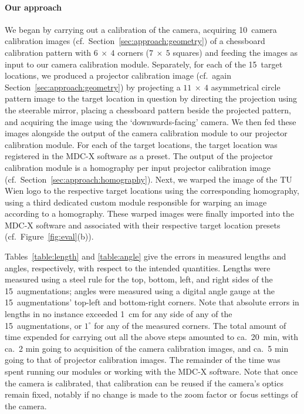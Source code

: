 \documentclass[review]{elsarticle}
\begin{document}
\paragraph{Our approach} We began by carrying out a calibration of the camera, acquiring 10~camera calibration images (cf.\ Section~\ref{sec:approach:geometry}) of a chessboard calibration pattern with $6~\times~4$ corners ($7~\times~5$ squares) and feeding the images as input to our camera calibration module. Separately, for each of the 15~target locations, we produced a projector calibration image (cf.\ again Section~\ref{sec:approach:geometry}) by projecting a $11~\times~4$ asymmetrical circle pattern image to the target location in question by directing the projection using the steerable mirror, placing a chessboard pattern beside the projected pattern, and acquiring the image using the `downwards-facing' camera. We then fed these images alongside the output of the camera calibration module to our projector calibration module. For each of the target locations, the target location was registered in the MDC-X software as a preset. The output of the projector calibration module is a homography per input projector calibration image (cf.\ Section~\ref{sec:approach:homography}). Next, we warped the image of the TU Wien logo to the respective target locations using the corresponding homography, using a third dedicated custom module responsible for warping an image according to a homography. These warped images were finally imported into the MDC-X software and associated with their respective target location presets (cf.\ Figure~\ref{fig:eval}(b)).

Tables~\ref{table:length} and \ref{table:angle} give the errors in measured lengths and angles, respectively, with respect to the intended quantities. Lengths were measured using a steel rule for the top, bottom, left, and right sides of the 15~augmentations; angles were measured using a digital angle gauge at the 15~augmentations' top-left and bottom-right corners. Note that absolute errors in lengths in no instance exceeded 1~cm for any side of any of the 15~augmentations, or $1^\circ{}$ for any of the measured corners. The total amount of time expended for carrying out all the above steps amounted to ca.\ 20~min, with ca.\ 2 min going to acquisition of the camera calibration images, and ca.\ 5 min going to that of projector calibration images. The remainder of the time was spent running our modules or working with the MDC-X software. Note that once the camera is calibrated, that calibration can be reused if the camera's optics remain fixed, notably if no change is made to the zoom factor or focus settings of the camera.
\end{document}
